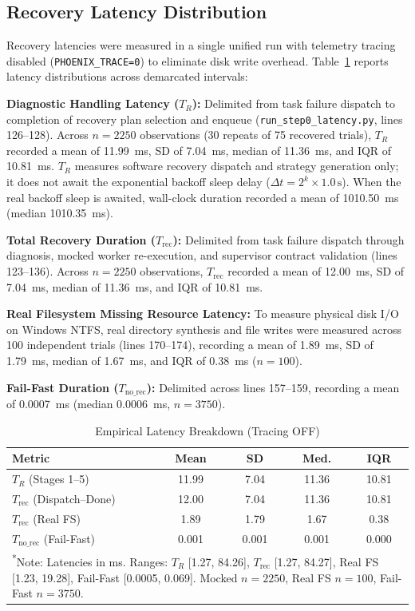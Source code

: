 \documentclass[conference]{IEEEtran}
\begin{document}
\subsection{Recovery Latency Distribution}
Recovery latencies were measured in a single unified run with telemetry tracing disabled (\texttt{PHOENIX\_TRACE=0}) to eliminate disk write overhead. Table~\ref{tab:latency_breakdown} reports latency distributions across demarcated intervals:

\textbf{Diagnostic Handling Latency ($T_R$):} Delimited from task failure dispatch to completion of recovery plan selection and enqueue (\texttt{run\_step0\_latency.py}, lines 126--128). Across $n=2250$ observations (30 repeats of 75 recovered trials), $T_R$ recorded a mean of 11.99~ms, SD of 7.04~ms, median of 11.36~ms, and IQR of 10.81~ms. $T_R$ measures software recovery dispatch and strategy generation only; it does not await the exponential backoff sleep delay ($\Delta t = 2^k \times 1.0\,\text{s}$). When the real backoff sleep is awaited, wall-clock duration recorded a mean of 1010.50~ms (median 1010.35~ms).

\textbf{Total Recovery Duration ($T_{\text{rec}}$):} Delimited from task failure dispatch through diagnosis, mocked worker re-execution, and supervisor contract validation (lines 123--136). Across $n=2250$ observations, $T_{\text{rec}}$ recorded a mean of 12.00~ms, SD of 7.04~ms, median of 11.36~ms, and IQR of 10.81~ms.

\textbf{Real Filesystem Missing Resource Latency:} To measure physical disk I/O on Windows NTFS, real directory synthesis and file writes were measured across 100 independent trials (lines 170--174), recording a mean of 1.89~ms, SD of 1.79~ms, median of 1.67~ms, and IQR of 0.38~ms ($n=100$).

\textbf{Fail-Fast Duration ($T_{\text{no\_rec}}$):} Delimited across lines 157--159, recording a mean of 0.0007~ms (median 0.0006~ms, $n=3750$).

\begin{table}[t]
\centering
\caption{Empirical Latency Breakdown (Tracing OFF)}
\label{tab:latency_breakdown}
\footnotesize
\begin{tabularx}{\columnwidth}{Xcccc}
\toprule
\textbf{Metric} & \textbf{Mean} & \textbf{SD} & \textbf{Med.} & \textbf{IQR} \\
\midrule
$T_R$ (Stages 1--5) & 11.99 & 7.04 & 11.36 & 10.81 \\
$T_{\text{rec}}$ (Dispatch--Done) & 12.00 & 7.04 & 11.36 & 10.81 \\
$T_{\text{rec}}$ (Real FS) & 1.89 & 1.79 & 1.67 & 0.38 \\
$T_{\text{no\_rec}}$ (Fail-Fast) & 0.001 & 0.001 & 0.001 & 0.000 \\
\bottomrule
\multicolumn{5}{p{0.95\columnwidth}}{\textsuperscript{*}Note: Latencies in ms. Ranges: $T_R$ [1.27, 84.26], $T_{\text{rec}}$ [1.27, 84.27], Real FS [1.23, 19.28], Fail-Fast [0.0005, 0.069]. Mocked $n=2250$, Real FS $n=100$, Fail-Fast $n=3750$.}
\end{tabularx}
\end{table}
\end{document}
